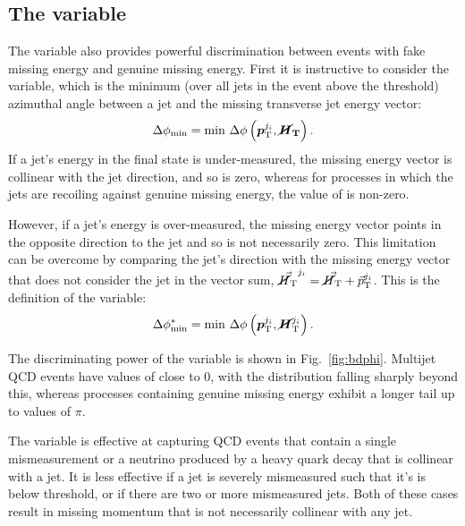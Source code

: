 \subsection{The \bdphi variable}

The \bdphi variable also provides powerful discrimination between events with 
fake missing energy and genuine missing energy.
First it is instructive to consider the \dphimin variable, which is the minimum 
(over all jets in the event above the \pt threshold) azimuthal angle between a 
jet and the missing transverse jet energy vector:
\begin{equation}
\Delta\phi_{\mathrm{min}} = \mathrm{min}~\Delta\phi\left(\bm{p}_{\mathrm 
T}^{j_i},\bm{\cancel{H}_\mathrm{T}}\right).
\end{equation}
If a jet's energy in the final state is under-measured, the missing energy 
vector is collinear with the jet direction, and so \dphimin is zero, whereas 
for processes in which the jets are recoiling against genuine missing energy, 
the value of \dphimin is non-zero.

However, if a jet's energy is over-measured, the missing energy vector points 
in the opposite direction to the jet and so \dphimin is not necessarily zero. 
This limitation can be overcome by comparing the jet's direction with the 
missing energy vector that does not consider the jet in the vector sum, 
$\vec{\mbox{$\cancel{H}_\text{T}$}}^{j_i} = \vec{\mbox{$\cancel{H}_\text{T}$}} + \vec{p}_{\mathrm T}^{j_i}$. This is the 
definition of the 
\bdphi variable:
\begin{equation}
\Delta\phi^{*}_{\mathrm{min}} = \mathrm{min}~\Delta\phi\left(\bm{p}_{\mathrm 
	T}^{j_i},\bm{\cancel{H}}_\mathrm{T}^{j_i}\right).
\end{equation}

The discriminating power of the \bdphi variable is shown in 
Fig.~\ref{fig:bdphi}. Multijet QCD events have values of \bdphi close to 0, 
with the distribution falling sharply beyond this, 
whereas processes containing genuine missing energy exhibit a longer tail up to 
values of $\pi$.

The \bdphi variable is effective at capturing QCD events that contain a single 
mismeasurement or a neutrino produced by a heavy quark decay that is collinear 
with a jet. It is less effective if a jet is severely mismeasured such 
that it's \pt is below threshold, or if there are two or more mismeasured jets. 
Both of these cases result in missing momentum that is not necessarily 
collinear with any jet.

